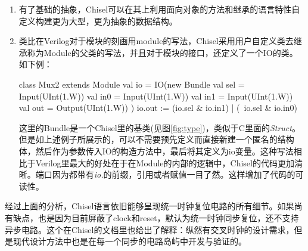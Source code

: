 \begin{enumerate}[label=(\alph*)]
	\item 有了基础的抽象，Chisel可以在其上利用面向对象的方法和继承的语言特性自定义构建更为大型，更为抽象的数据结构。
	\item 类比在Verilog对于模块的刻画用module的写法，Chisel采用用户自定义类去继承称为Module的父类的写法，并且对于模块的接口，还定义了一个IO的类。如下例\citep{chisel2017}：
	\begin{scala}
		class Mux2 extends Module {
			val io = IO(new Bundle{
				val sel = Input(UInt(1.W))
				val in0 = Input(UInt(1.W))
				val in1 = Input(UInt(1.W))
				val out = Output(UInt(1.W))
			})
			io.out := (io.sel & io.in1) | (~io.sel & io.in0)
		}
	\end{scala}
	这里的Bundle是一个Chisel里的基类(见图\ref{fig:type})，类似于C里面的\textit{Struct}。但是如上述例子所展示的，可以不需要预先定义而直接新建一个匿名的结构体，然后作为参数传入IO的构造方法中，最后将其定义为io变量。这种写法相比于Verilog里最大的好处在于在Module的内部的逻辑中，Chisel的代码更加清晰。端口因为都带有\textit{io.}的前缀，引用或者赋值一目了然。这样增加了代码的可读性。
\end{enumerate}

经过上面的分析，Chisel语言依旧能够呈现统一时钟复位电路的所有细节。如果尚有缺点，也是因为目前屏蔽了clock和reset，默认为统一时钟同步复位，还不支持异步电路。这个在Chisel的文档里也给出了解释：纵然有交叉时钟的设计需求，但是现代设计方法中也是在每一个同步的电路岛屿中开发与验证的\citep{chisel2017}。

